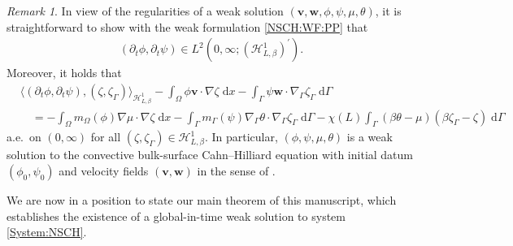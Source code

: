 \documentclass[11pt,reqno]{amsart}
\theoremstyle{remark}
\newtheorem{remark}[theorem]{Remark}
\numberwithin{equation}{section}
\newcommand{\intO}{\int_\Omega}
\newcommand{\intG}{\int_\Gamma}
\newcommand{\dx}{\;\mathrm{d}x}
\newcommand{\dG}{\;\mathrm d\Ga}
\newcommand{\delt}{\partial_{t}}
\newcommand{\Grad}{\nabla}
\newcommand{\Gradg}{\nabla_\Ga}
\newcommand{\Om}{\Omega}
\newcommand{\Ga}{\Gamma}
\newcommand{\bv}{\mathbf v}
\newcommand{\bw}{\mathbf w}
\begin{document}
\begin{remark}
In view of the regularities of a weak solution $(\bv,\bw,\phi,\psi,\mu,\theta)$, it is straightforward to show with the weak formulation \eqref{NSCH:WF:PP} that 
\begin{align*}
	(\delt\phi,\delt\psi)\in L^2(0,\infty;(\mathcal{H}^1_{L,\beta})^\prime).
\end{align*}
Moreover, it holds that
\begin{align*}
	&\big\langle(\delt\phi,\delt\psi),(\zeta,\zeta_\Ga)\big\rangle_{\mathcal{H}^1_{L,\beta}}  - \intO\phi\bv\cdot\Grad\zeta\dx - \intG \psi\bw\cdot\Gradg\zeta_\Ga\dG \\
	&\quad = - \intO m_\Om(\phi)\Grad\mu\cdot\Grad\zeta\dx - \intG m_\Ga(\psi)\Gradg\theta\cdot\Gradg\zeta_\Ga\dG - \chi(L)\intG (\beta\theta - \mu)(\beta\zeta_\Ga - \zeta)\dG
\end{align*}
a.e.~on $(0,\infty)$ for all $(\zeta,\zeta_\Ga)\in\mathcal{H}^1_{L,\beta}$. In particular, $(\phi,\psi,\mu,\theta)$ is a weak solution to the convective bulk-surface Cahn--Hilliard equation with initial datum $(\phi_0,\psi_0)$ and velocity fields $(\bv,\bw)$ in the sense of \cite[Definition~3.1]{Knopf2025}.
\end{remark}

We are now in a position to state our main theorem of this manuscript, which establishes the existence of a global-in-time weak solution to system \eqref{System:NSCH}.
\end{document}
